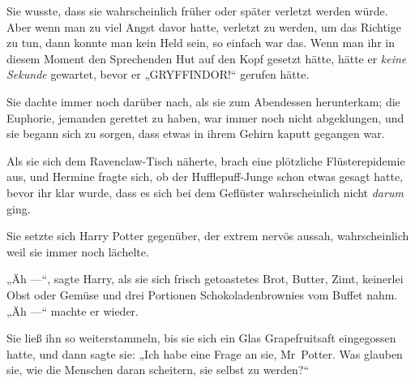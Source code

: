 Sie wusste, dass sie wahrscheinlich früher oder später verletzt werden würde. Aber wenn man zu viel Angst davor hatte, verletzt zu werden, um das Richtige zu tun, dann konnte man kein Held sein, so einfach war das. Wenn man ihr in diesem Moment den Sprechenden Hut auf den Kopf gesetzt hätte, hätte er \emph{keine Sekunde} gewartet, bevor er
„GRYFFINDOR!“ gerufen hätte.

\later

Sie dachte immer noch darüber nach, als sie zum Abendessen herunterkam; die Euphorie, jemanden gerettet zu haben, war immer noch nicht abgeklungen, und sie begann sich zu sorgen, dass etwas in ihrem Gehirn kaputt gegangen war.

Als sie sich dem Ravenclaw-Tisch näherte, brach eine plötzliche Flüsterepidemie aus, und Hermine fragte sich, ob der Hufflepuff-Junge schon etwas gesagt hatte, bevor ihr klar wurde, dass es sich bei dem Geflüster wahrscheinlich nicht \emph{darum} ging.

Sie setzte sich Harry Potter gegenüber, der extrem nervös aussah, wahrscheinlich weil sie immer noch lächelte.

„Äh —“, sagte Harry, als sie sich frisch getoastetes Brot, Butter, Zimt, keinerlei Obst oder Gemüse und drei Portionen Schokoladenbrownies vom Buffet nahm. „Äh —“ machte er wieder.

Sie ließ ihn so weiterstammeln, bis sie sich ein Glas Grapefruitsaft eingegossen hatte, und dann sagte sie:
„Ich habe eine Frage an sie, Mr~Potter. Was glauben sie, wie die Menschen daran scheitern, sie selbst zu werden?“


